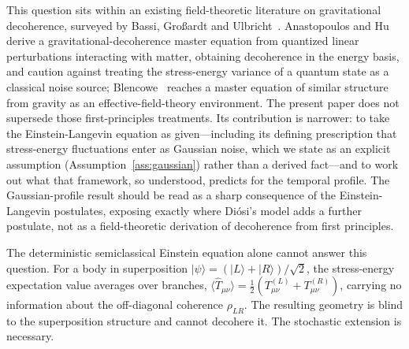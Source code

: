 \documentclass[12pt,a4paper]{article}
\theoremstyle{remark}
\begin{document}
This question sits within an existing field-theoretic literature on gravitational
decoherence, surveyed by Bassi, Gro\ss ardt and Ulbricht~\cite{bassi_review}.
Anastopoulos and Hu~\cite{anastopoulos_hu} derive a gravitational-decoherence master
equation from quantized linear perturbations interacting with matter, obtaining
decoherence in the energy basis, and caution against treating the stress-energy variance
of a quantum state as a classical noise source; Blencowe~\cite{blencowe} reaches a
master equation of similar structure from gravity as an effective-field-theory
environment. The present paper does not supersede those first-principles treatments. Its
contribution is narrower: to take the Einstein-Langevin equation as given---including its
defining prescription that stress-energy fluctuations enter as Gaussian noise, which we
state as an explicit assumption (Assumption~\ref{ass:gaussian}) rather than a derived
fact---and to work out what that framework, so understood, predicts for the temporal
profile. The Gaussian-profile result should be read as a sharp consequence of the
Einstein-Langevin postulates, exposing exactly where Di\'osi's model adds a further
postulate, not as a field-theoretic derivation of decoherence from first principles.

The deterministic semiclassical Einstein equation alone cannot answer this question. For a
body in superposition $|\psi\rangle = (|L\rangle + |R\rangle)/\sqrt{2}$, the
stress-energy expectation value averages over branches,
$\langle\hat{T}_{\mu\nu}\rangle = \frac{1}{2}(T^{(L)}_{\mu\nu} + T^{(R)}_{\mu\nu})$,
carrying no information about the off-diagonal coherence $\rho_{LR}$. The resulting
geometry is blind to the superposition structure and cannot decohere it. The stochastic
extension is necessary.
\end{document}
